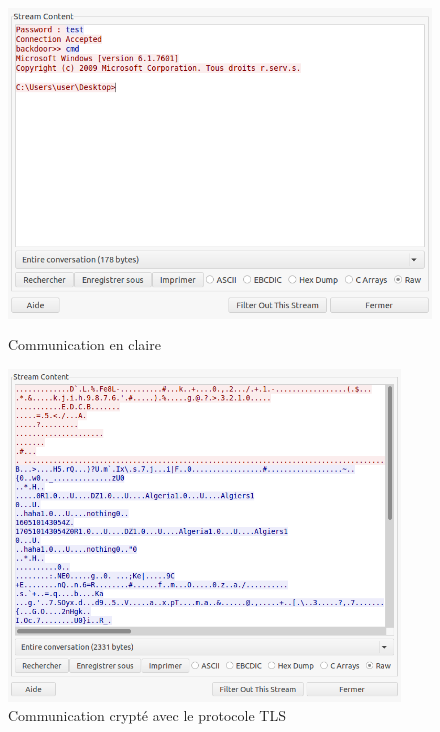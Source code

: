         \begin{figure}[!h]
            \centering
            \includegraphics[width=0.8\linewidth, height=250pt]{images/communication_claire.png}
            \caption{Communication en claire}
            \label{communication_claire}
        \end{figure}
        \begin{figure}[!h]
            \centering
            \includegraphics[width=0.8\linewidth, height=250pt]{images/communication_cryptee.png}
            \caption{Communication crypté avec le protocole TLS}
            \label{communication_cryptee}
        \end{figure}


